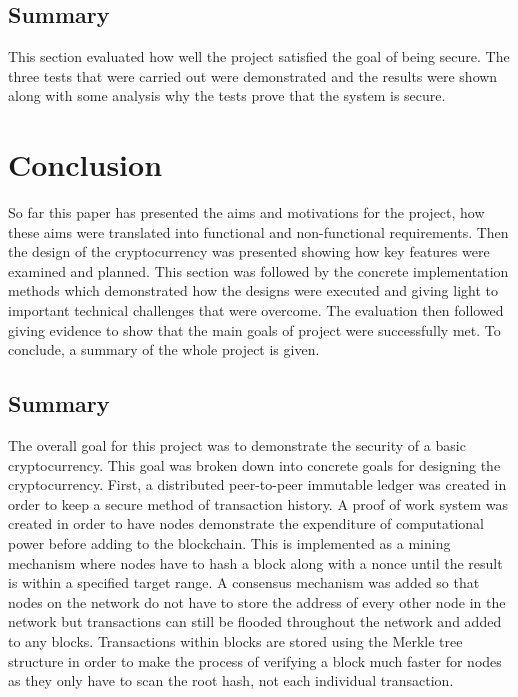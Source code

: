 \documentclass{l4proj}
\begin{document}
\section{Summary}
This section evaluated how well the project satisfied the goal of being secure. The three tests that were carried out
were demonstrated and the results were shown along with some analysis why the tests prove that the system is secure.

\chapter{Conclusion}
So far this paper has presented the aims and motivations for the project, how these aims were translated into functional
and non-functional requirements. Then the design of the cryptocurrency was presented showing how key features were examined
and planned. This section was followed by the concrete implementation methods which demonstrated how the designs were 
executed and giving light to important technical challenges that were overcome. The evaluation then followed giving evidence
to show that the main goals of project were successfully met. To conclude, a summary of the whole 
project is given.

\section{Summary}
The overall goal for this project was to demonstrate the security of a basic cryptocurrency. This goal was broken down
into concrete goals for designing the cryptocurrency. First, a distributed peer-to-peer immutable ledger was created 
in order to keep a secure method of transaction history. A proof of work system was created in order to have nodes
demonstrate the expenditure of computational power before adding to the blockchain. This is implemented as a mining
mechanism where nodes have to hash a block along with a nonce until the result is within a specified target range. A
consensus mechanism was added so that nodes on the network do not have to store the address of every other node in the network
but transactions can still be flooded throughout the network and added to any blocks. Transactions within blocks are
stored using the Merkle tree structure in order to make the process of verifying a block much faster for nodes as they
only have to scan the root hash, not each individual transaction.
\end{document}
